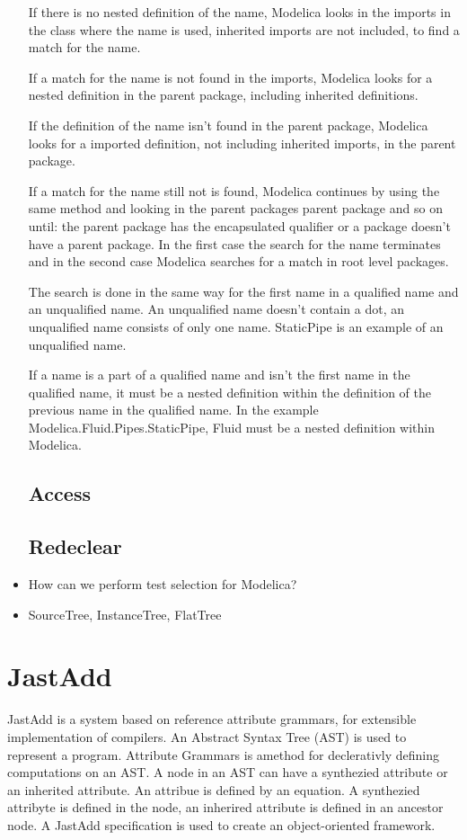 \documentclass{cslthse-msc}
\begin{document}
\begin{itemize}
If there is no nested definition of the name, Modelica looks in the imports in the class where the name is used, inherited imports are not included, to find a match for the name.

If a match for the name is not found in the imports, Modelica looks for a nested definition in the parent package, including inherited definitions.

If the definition of the name isn't found in the parent package, Modelica looks for a imported definition, not including inherited imports, in the parent package.

If a match for the name still not is found, Modelica continues by using the same method and looking in the parent packages parent package and so on until: the parent package has the encapsulated qualifier or a package doesn't have a parent package. In the first case the search for the name terminates and in the second case Modelica searches for a match in root level packages.

The search is done in the same way for the first name in a qualified name and an unqualified name. An unqualified name doesn't contain a dot, an unqualified name consists of only one name. StaticPipe is an example of an unqualified name.

If a name is a part of a qualified name and isn't the first name in the qualified name, it must be a nested definition within the definition of the previous name in the qualified name. In the example Modelica.Fluid.Pipes.StaticPipe, Fluid must be a nested definition within Modelica.\cite{modelicamodelica, tillermodelica}

\subsection{Access}

\subsection{Redeclear}
	\item How can we perform test selection for Modelica?
	\item SourceTree, InstanceTree, FlatTree
\end{itemize}

\section{JastAdd}
JastAdd is a system based on reference attribute grammars, for extensible implementation of compilers. An Abstract Syntax Tree (AST) is used to represent a program. Attribute Grammars is amethod for declerativly defining computations on an AST. A node in an AST can have a synthezied attribute or an inherited attribute. An attribue is defined by an equation. A synthezied attribyte is defined in the node, an inherired attribute is defined in an ancestor node. A JastAdd specification is used to create an object-oriented framework.~\cite{aakesson2008development}
\end{document}

